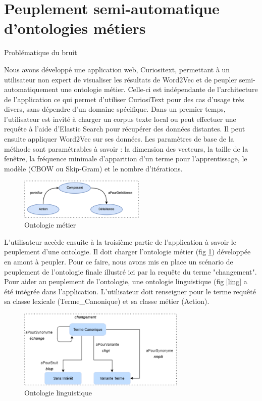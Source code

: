 \section{Peuplement semi-automatique d'ontologies métiers}

Problématique du bruit

Nous avons développé une application web, Curiositext, permettant à un utilisateur non expert de visualiser les résultats de Word2Vec et de peupler semi-automatiquement une ontologie métier. Celle-ci est indépendante de l'architecture de l'application ce qui permet d'utiliser CuriosiText pour des cas d'usage très divers, sans dépendre d'un domaine spécifique. Dans un premier temps, l'utilisateur est invité à charger un corpus texte local ou peut effectuer une requête à l'aide d'Elastic Search pour récupérer des données distantes. Il peut ensuite appliquer Word2Vec sur ses données. Les paramètres de base de la méthode sont paramétrables à savoir : la dimension des vecteurs, la taille de la fenêtre, la fréquence minimale d'apparition d’un terme pour l’apprentissage, le modèle (CBOW ou Skip-Gram) et le nombre d’itérations.

\begin{figure}[tb]
    \begin{center}
        \includegraphics[width=6cm]{figures/ontMetier}
    \end{center}
    \caption{Ontologie métier}\label{fig:metier}
\end{figure}

L'utilisateur accède ensuite à la troisième partie de l'application à savoir le peuplement d'une ontologie. Il doit charger l’ontologie métier (fig \ref{fig:metier}) développée en amont à peupler. Pour ce faire, nous avons mis en place un scénario de peuplement de l'ontologie finale illustré ici par la requête du terme "changement".
Pour aider au peuplement de l'ontologie, une ontologie linguistique (fig \ref{ling} a été intégrée dans l'application. L'utilisateur doit renseigner pour le terme requêté sa classe lexicale (Terme\_Canonique) et sa classe métier (Action).

\begin{figure}[tb]
    \begin{center}
        \includegraphics[width=8cm]{figures/ontLing}
    \end{center}
    \caption{Ontologie linguistique}\label{fig:ling}
\end{figure}




